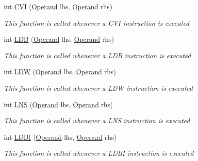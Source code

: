 \begin{DoxyCompactItemize}
int \hyperlink{class_c_p_u___o_s___simulator_1_1_c_p_u_1_1_instruction_af73e92c10474c39863df39c1f826ff50}{C\+V\+I} (\hyperlink{class_c_p_u___o_s___simulator_1_1_c_p_u_1_1_operand}{Operand} lhs, \hyperlink{class_c_p_u___o_s___simulator_1_1_c_p_u_1_1_operand}{Operand} rhs)
\begin{DoxyCompactList}\small\item\em This function is called whenever a C\+V\+I instruction is executed \end{DoxyCompactList}\item 
int \hyperlink{class_c_p_u___o_s___simulator_1_1_c_p_u_1_1_instruction_ae09705d74d57f968b93ba1739832488f}{L\+D\+B} (\hyperlink{class_c_p_u___o_s___simulator_1_1_c_p_u_1_1_operand}{Operand} lhs, \hyperlink{class_c_p_u___o_s___simulator_1_1_c_p_u_1_1_operand}{Operand} rhs)
\begin{DoxyCompactList}\small\item\em This function is called whenever a L\+D\+B instruction is executed \end{DoxyCompactList}\item 
int \hyperlink{class_c_p_u___o_s___simulator_1_1_c_p_u_1_1_instruction_adc1b564050331c46094af907abb34acb}{L\+D\+W} (\hyperlink{class_c_p_u___o_s___simulator_1_1_c_p_u_1_1_operand}{Operand} lhs, \hyperlink{class_c_p_u___o_s___simulator_1_1_c_p_u_1_1_operand}{Operand} rhs)
\begin{DoxyCompactList}\small\item\em This function is called whenever a L\+D\+W instruction is executed \end{DoxyCompactList}\item 
int \hyperlink{class_c_p_u___o_s___simulator_1_1_c_p_u_1_1_instruction_abaa66d00b38349cd8033c8c1428a9ca3}{L\+N\+S} (\hyperlink{class_c_p_u___o_s___simulator_1_1_c_p_u_1_1_operand}{Operand} lhs, \hyperlink{class_c_p_u___o_s___simulator_1_1_c_p_u_1_1_operand}{Operand} rhs)
\begin{DoxyCompactList}\small\item\em This function is called whenever a L\+N\+S instruction is executed \end{DoxyCompactList}\item 
int \hyperlink{class_c_p_u___o_s___simulator_1_1_c_p_u_1_1_instruction_a41d94be59f02b4ff381bed811f0c4f2e}{L\+D\+B\+I} (\hyperlink{class_c_p_u___o_s___simulator_1_1_c_p_u_1_1_operand}{Operand} lhs, \hyperlink{class_c_p_u___o_s___simulator_1_1_c_p_u_1_1_operand}{Operand} rhs)
\begin{DoxyCompactList}\small\item\em This function is called whenever a L\+D\+B\+I instruction is executed \end{DoxyCompactList}\item 

\end{DoxyCompactItemize}

